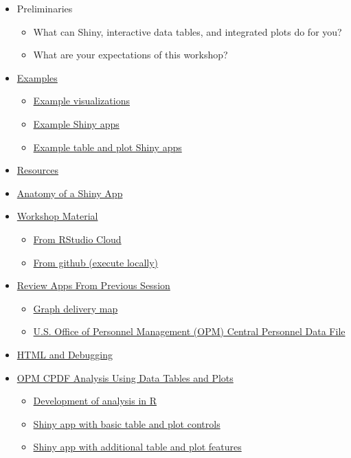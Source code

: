 \documentclass[10pt, letterpaper]{article}
\begin{document}
\begin{spacing}{1.0}
\begin{itemize}
    \item Preliminaries
      \begin{itemize}
        \item What can Shiny, interactive data tables, and integrated plots do for you?
        \item What are your expectations of this workshop?
      \end{itemize}
    \item \hyperref[sec:examples]{Examples}
      \begin{itemize}
          \item \hyperref[sec:examplevis]{Example visualizations}
          \item \hyperref[sec:exampleapps]{Example Shiny apps}
          \item \hyperref[sec:examplesDT]{Example table and plot Shiny apps}
      \end{itemize}
    \item \hyperref[sec:resources]{Resources}
    \item \hyperref[sec:anatomyofapp]{Anatomy of a Shiny App}
    \item \hyperref[sec:accesworkshopmaterial]{Workshop Material}
      \begin{itemize}
        \item \hyperref[sec:materialcloud]{From RStudio Cloud}
        \item \hyperref[sec:materialgit]{From github (execute locally)}
      \end{itemize}
    \item \hyperref[sec:reviewapps]{Review Apps From Previous Session}
    \begin{itemize}
      \item \hyperref[sec:reviewappGraphDeliveryMap]{Graph delivery map}
      \item \hyperref[sec:reviewappOPM]{U.S. Office of Personnel Management (OPM) Central Personnel Data File}
    \end{itemize}
    \item \hyperref[sec:HTMLdebug]{HTML and Debugging}
    \item \hyperref[sec:DTplot]{OPM CPDF Analysis Using Data Tables and Plots}
      \begin{itemize}
        \item \hyperref[sec:DTplotR]{Development of analysis in R}
        \item \hyperref[sec:DTplot-Shiny-1]{Shiny app with basic table and plot controls}
        \item \hyperref[sec:DTplot-Shiny-2]{Shiny app with additional table and plot features}
      \end{itemize}
\end{itemize}


\end{spacing}
\end{document}
